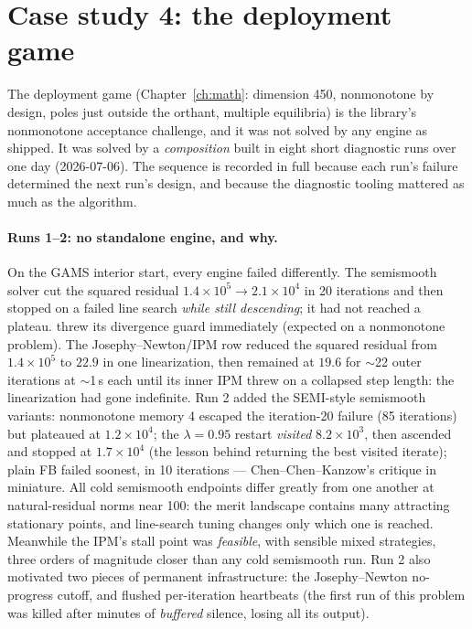 \section{Case study 4: the deployment game}
\label{sec:t-deploy}

The deployment game (Chapter~\ref{ch:math}: dimension 450, nonmonotone by
design, poles just outside the orthant, multiple equilibria) is the
library's nonmonotone acceptance challenge, and it was not solved by any
engine as shipped. It was solved by a \emph{composition} built in eight
short diagnostic runs over one day (2026-07-06). The sequence is recorded
in full because each run's failure determined the next run's design, and
because the diagnostic tooling mattered as much as the algorithm.

\paragraph{Runs 1--2: no standalone engine, and why.} On the GAMS interior
start, every engine failed differently. The semismooth solver cut the
squared residual $1.4\times 10^{5} \to 2.1\times 10^{4}$ in 20 iterations
and then stopped on a failed line search \emph{while still descending};
it had not reached a plateau.  threw its divergence guard
immediately (expected on a nonmonotone problem). The Josephy--Newton/IPM
row reduced the squared residual from $1.4\times 10^{5}$ to $22.9$ in one
linearization, then remained at $19.6$ for $\sim$22 outer iterations at
$\sim$1\,s each until its inner IPM threw on a collapsed step length: the
linearization had gone indefinite. Run 2 added the SEMI-style semismooth
variants: nonmonotone memory 4 escaped the iteration-20 failure (85
iterations) but plateaued at $1.2\times 10^{4}$; the $\lambda = 0.95$
restart \emph{visited} $8.2\times 10^{3}$, then ascended and stopped at
$1.7\times 10^{4}$ (the lesson behind returning the best visited iterate);
plain FB failed soonest, in 10 iterations --- Chen--Chen--Kanzow's
critique \cite{chen2000} in miniature. All cold semismooth endpoints
differ greatly from one another at natural-residual norms near 100: the
merit landscape contains many attracting stationary points, and
line-search tuning changes only which one is reached. Meanwhile the IPM's
stall point was \emph{feasible}, with sensible mixed strategies, three
orders of magnitude closer than any cold semismooth run. Run 2 also
motivated two pieces of permanent infrastructure: the Josephy--Newton
no-progress cutoff, and flushed per-iteration heartbeats (the first run of
this problem was killed after minutes of \emph{buffered} silence, losing
all its output).

